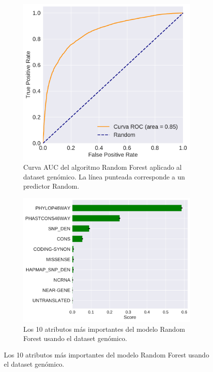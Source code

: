 \begin{figure}[H]
\centering
\begin{subfigure}[b]{0.7\textwidth}
    \centering
    \includegraphics[width=\textwidth]{documents/latex/figures/3/genomic/auc_genomic.pdf}
    \caption{Curva AUC del algoritmo Random Forest aplicado al dataset genómico. La línea punteada corresponde a un predictor Random.}
    \label{fig:auc_genomic}
\end{subfigure}

\hfill
\hfill

\begin{subfigure}[b]{0.7\textwidth}
    \centering
    \includegraphics[width=\textwidth]{documents/latex/figures/3/genomic/importances_genomic.pdf}
    \caption{Los 10 atributos más importantes del modelo Random Forest usando el dataset genómico.}
    \label{fig:importances_genomic}
\end{subfigure}

\end{figure}

